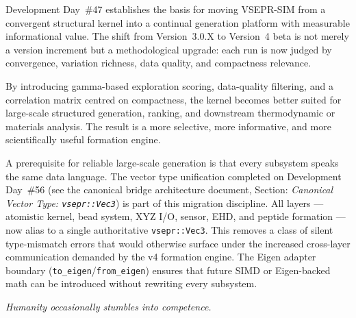 \documentclass[11pt]{article}
\begin{document}
Development Day~\#47 establishes the basis for moving VSEPR-SIM from a
convergent structural kernel into a continual generation platform with
measurable informational value.
The shift from Version~3.0.X to Version~4 beta is not merely a version
increment but a methodological upgrade: each run is now judged by
convergence, variation richness, data quality, and compactness relevance.

By introducing gamma-based exploration scoring, data-quality filtering,
and a correlation matrix centred on compactness, the kernel becomes
better suited for large-scale structured generation, ranking, and
downstream thermodynamic or materials analysis.
The result is a more selective, more informative, and more scientifically
useful formation engine.

A prerequisite for reliable large-scale generation is that every
subsystem speaks the same data language. The vector type unification
completed on Development Day~\#56 (see the canonical bridge architecture
document, Section: \textit{Canonical Vector Type: \texttt{vsepr::Vec3}})
is part of this migration discipline. All layers --- atomistic kernel,
bead system, XYZ I/O, sensor, EHD, and peptide formation --- now alias
to a single authoritative \texttt{vsepr::Vec3}. This removes a class of
silent type-mismatch errors that would otherwise surface under the
increased cross-layer communication demanded by the v4 formation engine.
The Eigen adapter boundary (\texttt{to\_eigen}/\texttt{from\_eigen})
ensures that future SIMD or Eigen-backed math can be introduced without
rewriting every subsystem.

\bigskip\noindent
\textit{Humanity occasionally stumbles into competence.}
\end{document}
